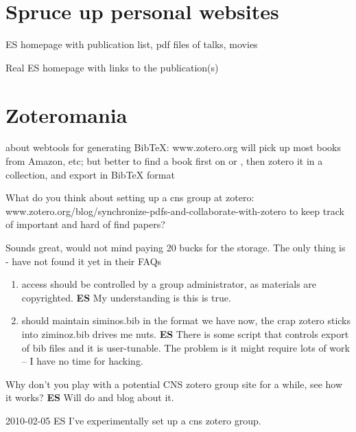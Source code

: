 \section{Spruce up personal websites}

ES homepage with publication list, pdf files of talks, movies

Real ES homepage with links to the publication(s)

\section{Zoteromania}

\begin{description}

\item[2008-07-18 Predrag] about webtools for generating BibTeX:
www.zotero.org
        will pick up most books from Amazon, etc; but
        better to find a book first on
          or
, then zotero it
          in a collection, and export in BibTeX format

\item[2009-12-22 Evangelos]
What do you think about setting up a cns group at zotero:
{www.zotero.org/blog/synchronize-pdfs-and-collaborate-with-zotero}
  to keep track of important and hard of find papers?

\item[2010-01-07 Predrag] Sounds great, would not mind paying 20 bucks for the
storage. The only thing is - have not found it yet in their FAQs
\begin{enumerate}
   \item access should
be controlled by a group administrator, as materials are copyrighted.
  {\bf ES} My understanding is this is true.
   \item should maintain siminos.bib in the format we have now, the
crap zotero sticks into ziminoz.bib drives me nuts.
  {\bf ES} There is some script that controls export of bib files
      and it is user-tunable. The problem is it might require lots
      of work -- I have no time for hacking.
\end{enumerate}
Why don't you play with a potential CNS zotero group site for a while,
see how it works? {\bf ES} Will do and blog about it.
\item{2010-02-05 ES}
I've experimentally set up a cns zotero group.


\end{description}
